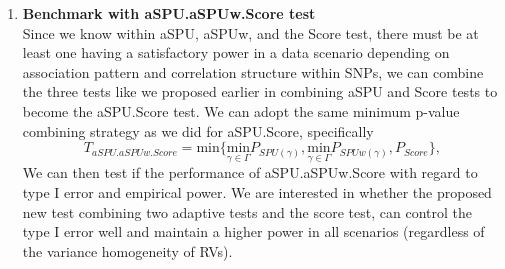 \documentclass[12pt]{article}
\begin{document}
\begin{enumerate}
\item \textbf{Benchmark with aSPU.aSPUw.Score test}\\
Since we know within aSPU, aSPUw, and the Score test, there must be at least one having a satisfactory power in a data scenario depending on association pattern and correlation structure within SNPs, we can combine the three tests like we proposed earlier in combining aSPU and Score tests to become the aSPU.Score test. We can adopt the same minimum p-value combining strategy as we did for aSPU.Score, specifically
$$
T_{aSPU.aSPUw.Score} = \textrm{min} \Big\{ \underset{\gamma\in\Gamma}{ \textrm{min} } P_{ SPU(\gamma) },\underset{\gamma\in\Gamma}{ \textrm{min} } P_{ SPUw(\gamma) }, P_{Score} \Big\},
$$ 
We can then test if the performance of aSPU.aSPUw.Score  with regard to type I error and empirical power. We are interested in whether the proposed new test combining two adaptive tests and the score test, can control the type I error well and maintain a higher power in all scenarios (regardless of the variance homogeneity of RVs).



\end{enumerate}



%
%


\end{document}
